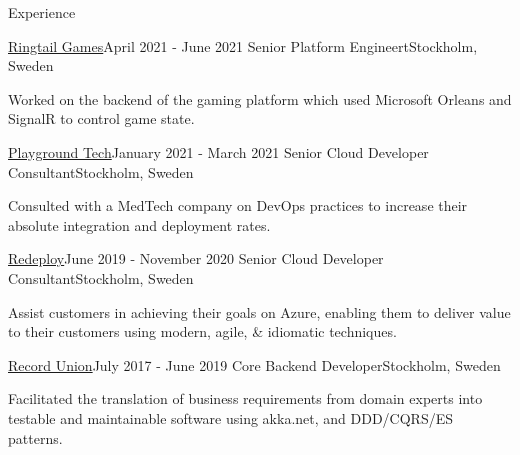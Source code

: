 \documentclass{resume} %
\begin{document}
    \begin{rSection}{Experience}

        \begin{rSubsection}
            {\href{https://www.ringtailgames.com/}{Ringtail Games}}{April 2021 - June 2021}
            {Senior Platform Engineert}{Stockholm, Sweden}
            
            \item Worked on the backend of the gaming platform which used Microsoft Orleans and SignalR to control game state.

         \end{rSubsection}

        \begin{rSubsection}
            {\href{https://www.playgroundcloud.se/}{Playground Tech}}{January 2021 - March 2021}
            {Senior Cloud Developer Consultant}{Stockholm, Sweden}
            
            \item Consulted with a MedTech company on  DevOps practices to increase their absolute integration and deployment rates.
                
        \end{rSubsection}

        \begin{rSubsection}
            {\href{https://redeploy.com}{Redeploy}}{June 2019 - November 2020}
            {Senior Cloud Developer Consultant}{Stockholm, Sweden}
            
            \item Assist customers in achieving their goals on Azure, enabling them to deliver
                value to their customers using modern, agile, \& idiomatic techniques.
                
        \end{rSubsection}

        \begin{rSubsection}
            {\href{https://recordunion.com}{Record Union}}{July 2017 - June 2019}
            {Core Backend Developer}{Stockholm, Sweden}
            
            \item Facilitated the translation of business requirements from domain
                experts into testable and maintainable software using akka.net,
                and DDD/CQRS/ES patterns.
                
        \end{rSubsection}


\end{rSection}
\end{document}
